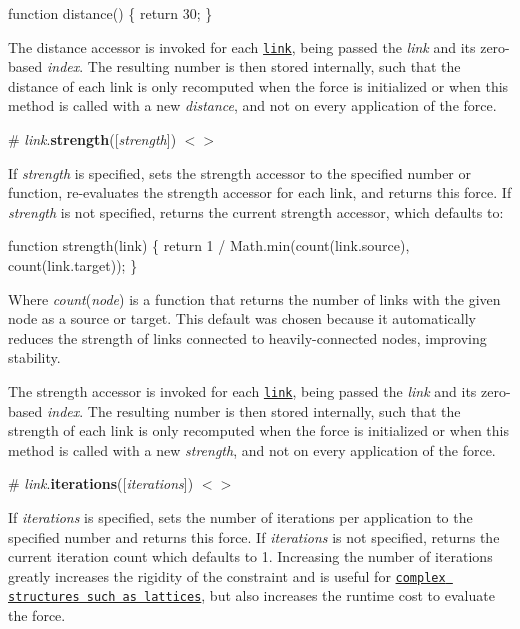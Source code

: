 \begin{DoxyCode}
function distance() \{
  return 30;
\}
\end{DoxyCode}


The distance accessor is invoked for each \href{#link_links}{\tt link}, being passed the {\itshape link} and its zero-\/based {\itshape index}. The resulting number is then stored internally, such that the distance of each link is only recomputed when the force is initialized or when this method is called with a new {\itshape distance}, and not on every application of the force.

\label{_link_strength}%
\# {\itshape link}.{\bfseries strength}(\mbox{[}{\itshape strength}\mbox{]}) \href{https://github.com/d3/d3-force/blob/master/src/link.js#L104}{\tt $<$$>$}

If {\itshape strength} is specified, sets the strength accessor to the specified number or function, re-\/evaluates the strength accessor for each link, and returns this force. If {\itshape strength} is not specified, returns the current strength accessor, which defaults to\+:


\begin{DoxyCode}
function strength(link) \{
  return 1 / Math.min(count(link.source), count(link.target));
\}
\end{DoxyCode}


Where {\itshape count}({\itshape node}) is a function that returns the number of links with the given node as a source or target. This default was chosen because it automatically reduces the strength of links connected to heavily-\/connected nodes, improving stability.

The strength accessor is invoked for each \href{#link_links}{\tt link}, being passed the {\itshape link} and its zero-\/based {\itshape index}. The resulting number is then stored internally, such that the strength of each link is only recomputed when the force is initialized or when this method is called with a new {\itshape strength}, and not on every application of the force.

\label{_link_iterations}%
\# {\itshape link}.{\bfseries iterations}(\mbox{[}{\itshape iterations}\mbox{]}) \href{https://github.com/d3/d3-force/blob/master/src/link.js#L100}{\tt $<$$>$}

If {\itshape iterations} is specified, sets the number of iterations per application to the specified number and returns this force. If {\itshape iterations} is not specified, returns the current iteration count which defaults to 1. Increasing the number of iterations greatly increases the rigidity of the constraint and is useful for \href{http://bl.ocks.org/mbostock/1b64ec067fcfc51e7471d944f51f1611}{\tt complex structures such as lattices}, but also increases the runtime cost to evaluate the force.


